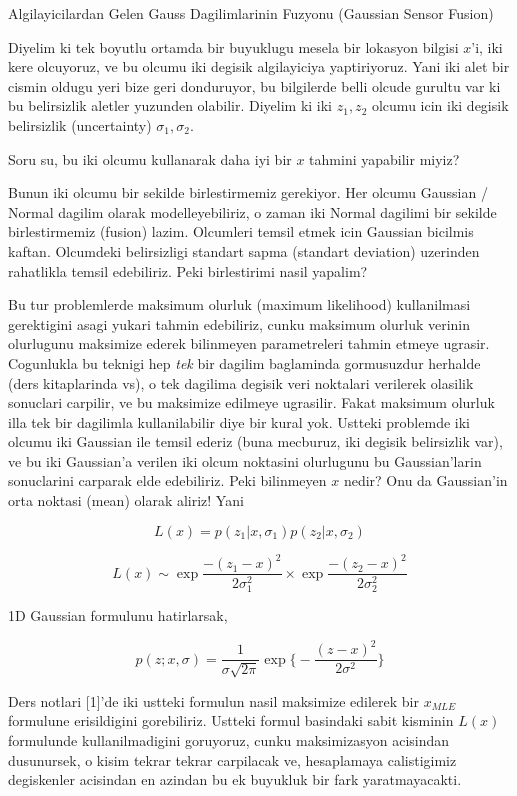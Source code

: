 \documentclass[12pt,fleqn]{article}\usepackage{../common}
\begin{document}
Algilayicilardan Gelen Gauss Dagilimlarinin Fuzyonu (Gaussian Sensor Fusion)

Diyelim ki tek boyutlu ortamda bir buyuklugu mesela bir lokasyon bilgisi
$x$'i, iki kere olcuyoruz, ve bu olcumu iki degisik algilayiciya
yaptiriyoruz. Yani iki alet bir cismin oldugu yeri bize geri donduruyor, bu
bilgilerde belli olcude gurultu var ki bu belirsizlik aletler yuzunden
olabilir. Diyelim ki iki $z_1,z_2$ olcumu icin iki degisik belirsizlik
(uncertainty) $\sigma_1,\sigma_2$. 

Soru su, bu iki olcumu kullanarak daha iyi bir $x$ tahmini yapabilir miyiz?

Bunun iki olcumu bir sekilde birlestirmemiz gerekiyor. Her olcumu Gaussian
/ Normal dagilim olarak modelleyebiliriz, o zaman iki Normal dagilimi bir
sekilde birlestirmemiz (fusion) lazim. Olcumleri temsil etmek icin Gaussian
bicilmis kaftan. Olcumdeki belirsizligi standart sapma (standart deviation)
uzerinden rahatlikla temsil edebiliriz. Peki birlestirimi nasil yapalim? 

Bu tur problemlerde maksimum olurluk (maximum likelihood) kullanilmasi
gerektigini asagi yukari tahmin edebiliriz, cunku maksimum olurluk verinin
olurlugunu maksimize ederek bilinmeyen parametreleri tahmin etmeye
ugrasir. Cogunlukla bu teknigi hep {\em tek} bir dagilim baglaminda
gormusuzdur herhalde (ders kitaplarinda vs), o tek dagilima degisik veri
noktalari verilerek olasilik sonuclari carpilir, ve bu maksimize edilmeye
ugrasilir. Fakat maksimum olurluk illa tek bir dagilimla kullanilabilir
diye bir kural yok. Ustteki problemde iki olcumu iki Gaussian ile temsil
ederiz (buna mecburuz, iki degisik belirsizlik var), ve bu iki Gaussian'a
verilen iki olcum noktasini olurlugunu bu Gaussian'larin sonuclarini
carparak elde edebiliriz. Peki bilinmeyen $x$ nedir? Onu da Gaussian'in
orta noktasi (mean) olarak aliriz! Yani

$$ L(x) = p(z_1|x,\sigma_1) p(z_2|x,\sigma_2) $$

$$ L(x) \sim \exp{\frac{-(z_1-x)^2}{2\sigma_1^2} } 
\times \exp \frac{-(z_2-x)^2}{2\sigma_2^2} $$

1D Gaussian formulunu hatirlarsak, 

$$ p(z;x,\sigma) = \frac{1}{\sigma\sqrt{2\pi}} 
\exp \bigg\{ - \frac{(z-x)^2}{2\sigma^2}  \bigg\}
 $$

Ders notlari [1]'de iki ustteki formulun nasil maksimize edilerek bir
$x_{MLE}$ formulune erisildigini gorebiliriz. Ustteki formul basindaki
sabit kisminin $L(x)$ formulunde kullanilmadigini goruyoruz, cunku
maksimizasyon acisindan dusunursek, o kisim tekrar tekrar carpilacak ve,
hesaplamaya calistigimiz degiskenler acisindan en azindan bu ek buyukluk
bir fark yaratmayacakti.
\end{document}
